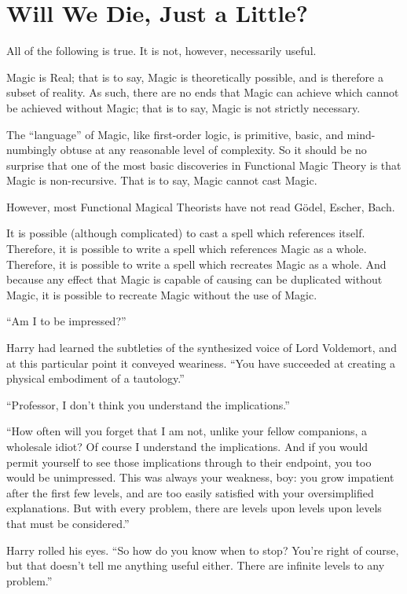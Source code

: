 \chapter{Will We Die, Just a Little?}

All of the following is true. It is not, however, necessarily useful.

Magic is Real; that is to say, Magic is theoretically possible, and is therefore a subset of reality. As such, there are no ends that Magic can achieve which cannot be achieved without Magic; that is to say, Magic is not strictly necessary.

The “language” of Magic, like first-order logic, is primitive, basic, and mind-numbingly obtuse at any reasonable level of complexity. So it should be no surprise that one of the most basic discoveries in Functional Magic Theory is that Magic is non-recursive. That is to say, Magic cannot cast Magic.

However, most Functional Magical Theorists have not read Gödel, Escher, Bach.

It is possible (although complicated) to cast a spell which references itself. Therefore, it is possible to write a spell which references Magic as a whole. Therefore, it is possible to write a spell which recreates Magic as a whole. And because any effect that Magic is capable of causing can be duplicated without Magic, it is possible to recreate Magic without the use of Magic.
\simpleline

“Am I to be impressed?”

Harry had learned the subtleties of the synthesized voice of Lord Voldemort, and at this particular point it conveyed weariness. “You have succeeded at creating a physical embodiment of a tautology.”

“Professor, I don’t think you understand the implications.”

“How often will you forget that I am not, unlike your fellow companions, a wholesale idiot? Of course I understand the implications. And if you would permit yourself to see those implications through to their endpoint, you too would be unimpressed. This was always your weakness, boy: you grow impatient after the first few levels, and are too easily satisfied with your oversimplified explanations. But with every problem, there are levels upon levels upon levels that must be considered.”

Harry rolled his eyes. “So how do you know when to stop? You’re right of course, but that doesn’t tell me anything useful either. There are infinite levels to any problem.”

